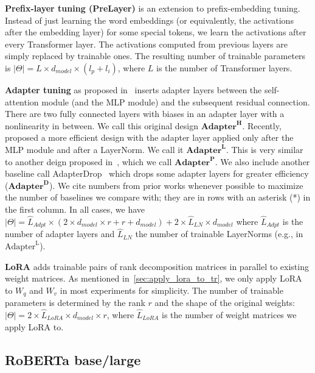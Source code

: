 \textbf{Prefix-layer tuning (PreLayer)} is an extension to prefix-embedding tuning.
Instead of just learning the word embeddings (or equivalently, the activations after the embedding layer) for some special tokens, we learn the activations after every Transformer layer.
The activations computed from previous layers are simply replaced by trainable ones.
The resulting number of trainable parameters is $|\Theta| = L \times d_{model} \times (l_p + l_i)$, where $L$ is the number of Transformer layers.

\textbf{Adapter tuning} as proposed in~\citet{houlsby_parameter-efficient_2019} inserts adapter layers between the self-attention module (and the MLP module) and the subsequent residual connection.
There are two fully connected layers with biases in an adapter layer with a nonlinearity in between.
We call this original design $\textbf{Adapter}^{\textbf{H}}$.
Recently, \citet{lin-etal-2020-exploring} proposed a more efficient design with the adapter layer applied only after the MLP module and after a LayerNorm.
We call it $\textbf{Adapter}^{\textbf{L}}$.
This is very similar to another deign proposed in~\citet{pfeiffer2021adapterfusion}, which we call $\textbf{Adapter}^{\textbf{P}}$.
We also include another baseline call AdapterDrop~\citep{ruckle2020adapterdrop} which drops some adapter layers for greater efficiency ($\textbf{Adapter}^{\textbf{D}}$).
We cite numbers from prior works whenever possible to maximize the number of baselines we compare with; they are in rows with an asterisk (*) in the first column.
In all cases,  we have $|\Theta| = \hat{L}_{Adpt} \times (2 \times d_{model} \times r + r + d_{model}) + 2 \times \hat{L}_{LN} \times d_{model}$ where $\hat{L}_{Adpt}$ is the number of adapter layers and $\hat{L}_{LN}$ the number of trainable LayerNorms (e.g., in $\text{Adapter}^{\text{L}}$).

\textbf{LoRA} adds trainable pairs of rank decomposition matrices in parallel to existing weight matrices.
As mentioned in~\autoref{sec:apply_lora_to_tr}, we only apply LoRA to $W_{q}$ and $W_{v}$ in most experiments for simplicity.
The number of trainable parameters is determined by the rank $r$ and the shape of the original weights: $|\Theta| = 2 \times \hat{L}_{LoRA} \times d_{model} \times r$, where $\hat{L}_{LoRA}$ is the number of weight matrices we apply LoRA to.

\subsection{RoBERTa base/large}
\label{sec:bert_expt}



